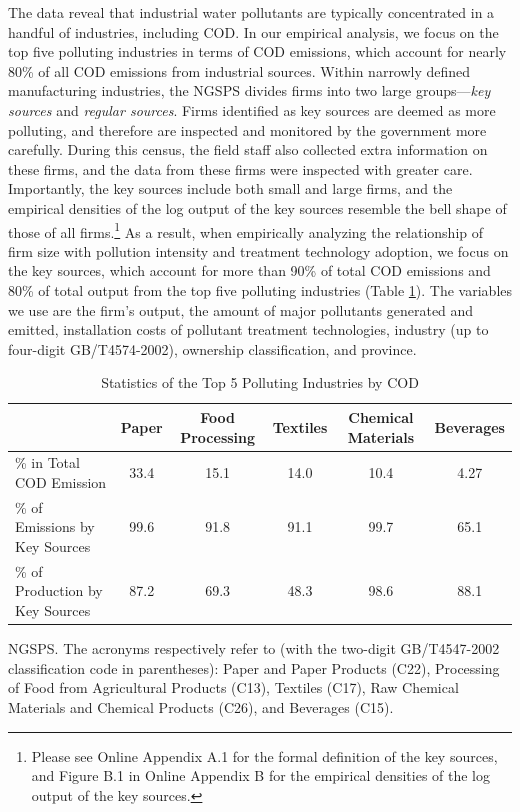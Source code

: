 \documentclass[AEJ]{AEA}
\begin{document}
The data reveal that industrial water pollutants are typically concentrated in a handful of industries, including COD. In our empirical analysis, we focus on the top five polluting industries in terms of COD emissions, which account for nearly 80\% of all COD emissions from industrial sources. Within narrowly defined manufacturing industries, the NGSPS divides firms into two large groups---\textit{key sources} and \textit{regular sources}. Firms identified as key sources are deemed as more polluting, and therefore are inspected and monitored by the government more carefully. %
During this census, the field staff also collected extra information on these firms, and the data from these firms were inspected with greater care. Importantly, the key sources include both small and large firms, and the empirical densities of the log output of the key sources resemble the bell shape of those of all firms.\footnote{Please see Online Appendix A.1 for the formal definition of the key sources, and Figure B.1 in Online Appendix B for  the empirical densities of the log output of the key sources.} As a result, when empirically analyzing the relationship of firm size with pollution intensity and treatment technology adoption, we focus on the key sources, which account for more than 90\% of total COD emissions and 80\% of total output from the top five polluting industries (Table \ref{tab:top5summary}). The variables we use are the firm's output, the amount of major pollutants generated and emitted, installation costs of pollutant treatment technologies, industry (up to four-digit GB/T4574-2002), ownership classification, and province.

\begin{table}[t]
\footnotesize
\centering
\caption{Statistics of the Top 5 Polluting Industries by COD}
\begin{tabular}{lccccc}
    \hline \hline
                                       & Paper & Food Processing& Textiles  & Chemical Materials & Beverages  \\
    \hline
    \% in Total COD Emission           & 33.4  & 15.1 & 14.0 & 10.4 & 4.27  \\
    \% of Emissions by Key Sources     & 99.6  & 91.8 & 91.1 & 99.7 & 65.1  \\
    \% of Production by Key Sources    & 87.2  & 69.3 & 48.3 & 98.6 & 88.1  \\
    \hline
\end{tabular}
\begin{tablenotes}[Sources]
     NGSPS. The acronyms respectively refer to (with the two-digit GB/T4547-2002 classification code in parentheses): Paper and Paper Products (C22), Processing of Food from Agricultural Products (C13), Textiles (C17), Raw Chemical Materials and Chemical Products (C26), and Beverages (C15).
\end{tablenotes}
\label{tab:top5summary}
\end{table}
\end{document}
